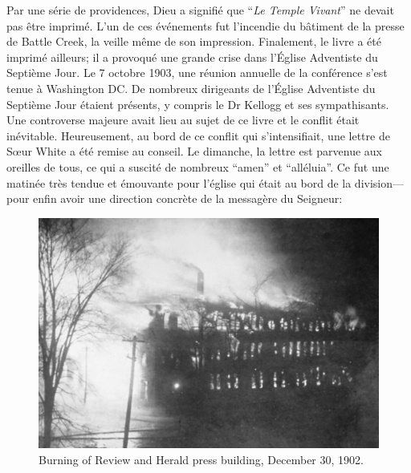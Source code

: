 Par une série de providences, Dieu a signifié que “\textit{Le Temple Vivant}” ne devait pas être imprimé. L'un de ces événements fut l'incendie du bâtiment de la presse de Battle Creek, la veille même de son impression. Finalement, le livre a été imprimé ailleurs; il a provoqué une grande crise dans l'Église Adventiste du Septième Jour. Le 7 octobre 1903, une réunion annuelle de la conférence s'est tenue à Washington DC. De nombreux dirigeants de l'Église Adventiste du Septième Jour étaient présents, y compris le Dr Kellogg et ses sympathisants. Une controverse majeure avait lieu au sujet de ce livre et le conflit était inévitable. Heureusement, au bord de ce conflit qui s'intensifiait, une lettre de Sœur White a été remise au conseil. Le dimanche, la lettre est parvenue aux oreilles de tous, ce qui a suscité de nombreux “amen” et “alléluia”. Ce fut une matinée très tendue et émouvante pour l'église qui était au bord de la division—pour enfin avoir une direction concrète de la messagère du Seigneur:


\begin{figure}[h]
    \centering
    \includegraphics[width=1\linewidth]{images/review-and-herlad.jpg}
    \caption*{Burning of Review and Herald press building, December 30, 1902.}
    \label{fig:review-and-herald}
\end{figure}



